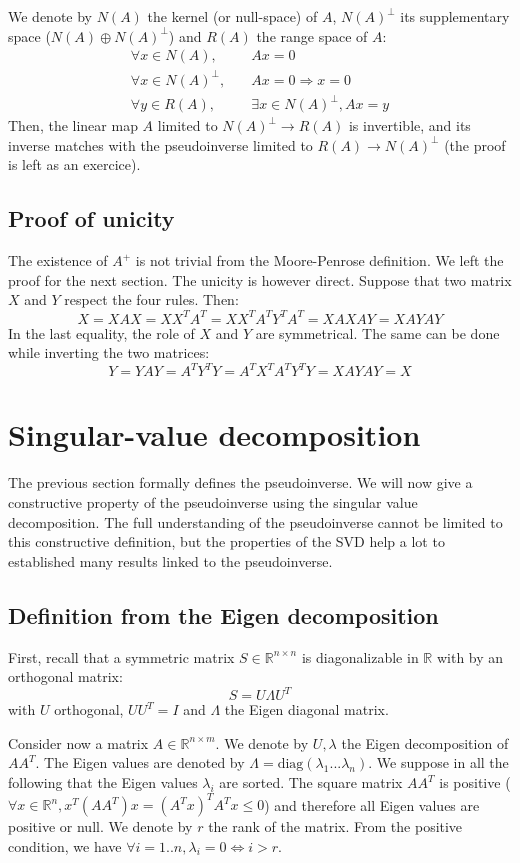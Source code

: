 \documentclass{book}
\begin{document}
We denote by $N(A)$ the kernel (or null-space) of $A$, $N(A)^\perp$ its supplementary space ($N(A) \oplus N(A)^\perp$) and $R(A)$ the range space of $A$:
\begin{align}
\forall x \in N(A), \quad& Ax=0 \\
\forall x \in N(A)^\perp, \quad& Ax=0 \Rightarrow x=0 \\
\forall y \in R(A),\quad& \exists x\in N(A)^\perp, Ax=y
\end{align}
Then, the linear map $A$ limited to $N(A)^\perp \rightarrow R(A)$ is invertible, and its inverse matches with the pseudoinverse limited to $R(A) \rightarrow N(A)^\perp$ (the proof is left as an exercice).

\subsection{Proof of unicity}
The existence of $A^+$ is not trivial from the Moore-Penrose definition. We left the proof for the next section. The unicity is however direct. Suppose that two matrix $X$ and $Y$ respect the four rules. Then:
$$ X = XAX = XX^TA^T = XX^TA^TY^TA^T = XAXAY = XAYAY $$
In the last equality, the role of $X$ and $Y$ are symmetrical. The same can be done while inverting the two matrices:
$$ Y = YAY = A^TY^TY = A^TX^TA^TY^TY = XAYAY = X $$


\section{Singular-value decomposition}

The previous section formally defines the pseudoinverse. We will now give a constructive property of the pseudoinverse using the singular value decomposition. The full understanding of the pseudoinverse cannot be limited to this constructive definition, but the properties of the SVD help a lot to established many results linked to the pseudoinverse.

\subsection{Definition from the Eigen decomposition}

First, recall that a symmetric matrix $S \in \mathbb{R}^{n\times n}$ is diagonalizable in $\mathbb{R}$ with by an orthogonal matrix:
$$ S = U \Lambda U^T $$
with $U$ orthogonal, \mie $UU^T = I$ and $\Lambda$ the Eigen diagonal matrix.

Consider now a matrix $A \in \mathbb{R}^{n \times m}$. We denote by $U,\lambda$ the Eigen decomposition of $AA^T$. The Eigen values are denoted by $\Lambda = \textrm{diag}( \lambda_1 ... \lambda_n )$. We suppose in all the following that the Eigen values $\lambda_i$ are sorted. The square matrix $AA^T$ is positive ($\forall x \in \mathbb{R}^n, x^T(AA^T)x = (A^Tx)^T A^Tx \leq 0$) and therefore all Eigen values are positive or null. We denote by $r$ the rank of the matrix. From the positive condition, we have $\forall i=1..n, \lambda_i =0 \iff i>r$.
\end{document}
